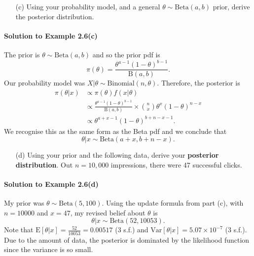 {{    
}

\clearpage

\begin{itemize}
\item [(c)] Using your probability model, and a general $\theta \sim \text{Beta}(a,b)$ prior, derive the posterior distribution.
\end{itemize}
\paragraph{Solution to Example 2.6(c)}{
    
    The prior is $\theta\sim \text{Beta}(a,b)$ and so the prior pdf is
    $$ \pi(\theta) = \frac{\theta^{a-1}(1-\theta)^{b-1}}{\mathrm{B}(a,b)}.$$
    Our probability model was $X|\theta \sim \text{Binomial}(n, \theta)$. Therefore, the posterior is
    \begin{align*}
        \pi(\theta|x) &\propto \pi(\theta) f(x|\theta) \\
        &\propto \frac{\theta^{a-1}(1-\theta)^{b-1}}{\mathrm{B}(a,b)} \times \binom{n}{x} \theta^{x}(1-\theta)^{n-x} \\
        &\propto \theta^{a + x - 1} (1-\theta)^{b + n - x - 1}.
    \end{align*}
    We recognise this as the same form as the Beta pdf and we conclude that $$\theta | x \sim \text{Beta}(a + x, b + n - x).$$
    
    
}

\begin{itemize}
\item [(d)] Using your prior and the following data, derive your \textbf{\color{darkblue}posterior distribution}. Out $n=10,000$ impressions, there were 47 successful clicks.
\end{itemize}
\paragraph{Solution to Example 2.6(d)}{
    
    My prior was $\theta \sim \text{Beta}(5, 100)$. Using the update formula from part (c), with $n = 10000$ and $x = 47$, my revised belief about $\theta$ is
    $$ \theta | x \sim \text{Beta}(52, 10053). $$
    Note that $\text{E}[\theta|x] = \frac{52}{10053} = 0.00517$ (3 s.f.) and $\text{Var}[\theta|x] = 5.07\times 10^{-7}$ (3 s.f.). Due to the amount of data, the posterior is dominated by the likelihood function since the variance is so small.
    
}}
